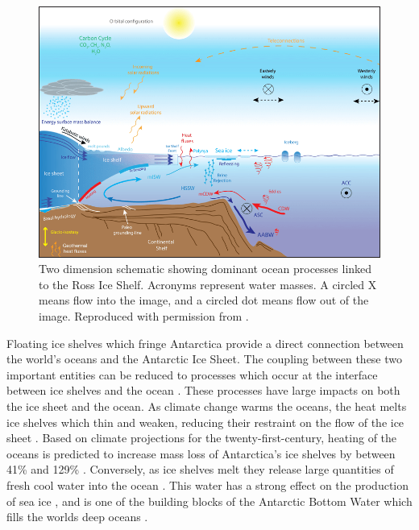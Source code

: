 \begin{figure}[!ht]
\centering
\includegraphics[width=1\textwidth]{chapters/1/ocean_schematic.png}
\caption[Ross Ice Shelf circulation schematic]{ Two dimension schematic showing dominant ocean processes linked to the Ross Ice Shelf. Acronyms represent water masses. A circled X means flow into the image, and a circled dot means flow out of the image.  Reproduced with permission from \cite{santis2018ross}. }
\label{fig:ocean_schematic}
\end{figure}  

Floating ice shelves which fringe Antarctica provide a direct connection between the world's oceans and the Antarctic Ice Sheet. The coupling between these two important entities can be reduced to processes which occur at the interface between ice shelves and the ocean \cite{holland2003modelling}. These processes have large impacts on both the ice sheet and the ocean. As climate change warms the oceans, the heat melts ice shelves which thin and weaken, reducing their restraint on the flow of the ice sheet \citep{pritchard2012antarctic}. Based on climate projections for the twenty-first-century, heating of the oceans is predicted to increase mass loss of Antarctica's ice shelves by between 41\% and 129\% \citep{naughten2018future}. Conversely, as ice shelves melt they release large quantities of fresh cool water into the ocean \citep[e.g.][]{holland2006effects}. This water has a strong effect on the production of sea ice \citep{langhorne2015observed}, and is one of the building blocks of the Antarctic Bottom Water which fills the worlds deep oceans \citep{foldvik2004ice}.

